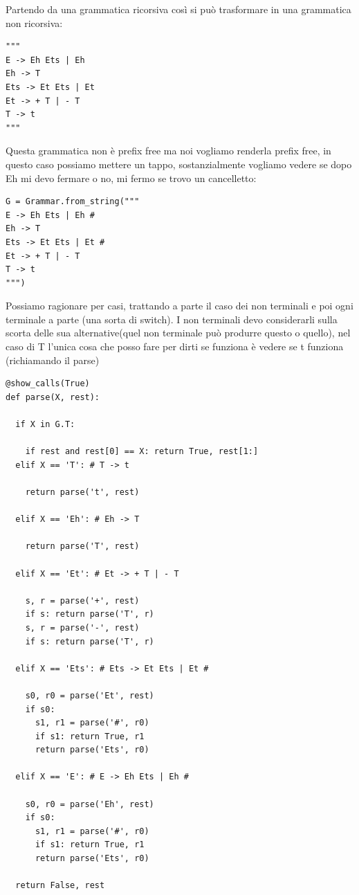 Partendo da una grammatica ricorsiva così si può trasformare in una grammatica non ricorsiva:
\begin{lstlisting}
"""
E -> Eh Ets | Eh
Eh -> T
Ets -> Et Ets | Et
Et -> + T | - T
T -> t
"""
\end{lstlisting}

Questa grammatica non è prefix free ma noi vogliamo renderla prefix free, in questo caso possiamo mettere un tappo, sostanzialmente vogliamo vedere se dopo Eh mi devo fermare o no, mi fermo se trovo un cancelletto:
\begin{lstlisting}
G = Grammar.from_string("""
E -> Eh Ets | Eh #
Eh -> T
Ets -> Et Ets | Et #
Et -> + T | - T
T -> t
""")
\end{lstlisting}

Possiamo ragionare per casi, trattando a parte il caso dei non terminali e poi ogni terminale a parte (una sorta di switch). I non terminali devo considerarli sulla scorta delle sua alternative(quel non terminale può produrre questo o quello), nel caso di T l'unica cosa che posso fare per dirti se funziona è vedere se t funziona (richiamando il parse)

\begin{lstlisting}
@show_calls(True)
def parse(X, rest):

  if X in G.T:

    if rest and rest[0] == X: return True, rest[1:]
  elif X == 'T': # T -> t

    return parse('t', rest)

  elif X == 'Eh': # Eh -> T

    return parse('T', rest)

  elif X == 'Et': # Et -> + T | - T

    s, r = parse('+', rest)
    if s: return parse('T', r)
    s, r = parse('-', rest)
    if s: return parse('T', r)

  elif X == 'Ets': # Ets -> Et Ets | Et #

    s0, r0 = parse('Et', rest)
    if s0:
      s1, r1 = parse('#', r0)
      if s1: return True, r1
      return parse('Ets', r0)
  
  elif X == 'E': # E -> Eh Ets | Eh #

    s0, r0 = parse('Eh', rest)
    if s0:
      s1, r1 = parse('#', r0)
      if s1: return True, r1
      return parse('Ets', r0)

  return False, rest
\end{lstlisting}

